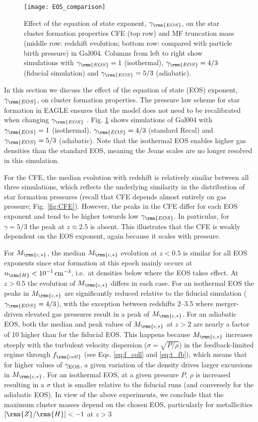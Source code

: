 \documentclass[fleqn,usenatbib]{mnras}
\newcommand\ZH{\lbrack \rmn{Z}/\rmn{H} \rbrack}
\newcommand{\cmcubed}              {\,{\rm cm}^{-3}}
\newcommand{\Mcstar}{M_\rmn{c,\ast}}
\begin{document}
\begin{figure*}
  \texttt{[image: EOS\_comparison]}
  \caption{ Effect of the equation of state exponent, $\gamma_\rmn{EOS}$, on the star cluster formation properties CFE (top row) and MF truncation mass (middle row: redshift evolution; bottom row: compared with particle birth pressure) in Gal004. Columns from left to right show simulations with $\gamma_\rmn{EOS} = 1$ (isothermal), $\gamma_\rmn{EOS} = 4/3$ (fiducial simulation) and $\gamma_\rmn{EOS} = 5/3$ (adiabatic).}
  \label{fig:EOS_test}
\end{figure*}

In this section we discuss the effect of the equation of state (EOS) exponent, $\gamma_\rmn{EOS}$, on cluster formation properties. The pressure law scheme for star formation in EAGLE ensures that the model does not need to be recalibrated when changing $\gamma_\rmn{EOS}$ \citep[see][for discussion]{S15, C15}. Fig. \ref{fig:EOS_test} shows simulations of Gal004 with $\gamma_\rmn{EOS}=1$ (isothermal), $\gamma_\rmn{EOS}=4/3$ (standard Recal) and $\gamma_\rmn{EOS}=5/3$ (adiabatic). Note that the isothermal EOS enables higher gas densities than the standard EOS, meaning the Jeans scales are no longer resolved in this simulation.

For the CFE, the median evolution with redshift is relatively similar between all three simulations, which reflects the underlying similarity in the distribution of star formation pressures (recall that CFE depends almost entirely on gas pressure; Fig. \ref{fig:CFE}). However, the peaks in the CFE differ for each EOS exponent and tend to be higher towards low $\gamma_\rmn{EOS}$. In particular, for $\gamma=5/3$ the peak at $z\approx2.5$ is absent. This illustrates that the CFE is weakly dependent on the EOS exponent, again because it scales with pressure.

For $\Mcstar$, the median $\Mcstar$ evolution at $z<0.5$ is similar for all EOS exponents since star formation at this epoch mainly occurs at $n_\rmn{H}<10^{-1}\cmcubed$, i.e.~at densities below where the EOS takes effect. At $z>0.5$ the evolution of $\Mcstar$ differs in each case. For an isothermal EOS the peaks in $\Mcstar$ are significantly reduced relative to the fiducial simulation ($\gamma_\rmn{EOS}=4/3$), with the exception between redshifts 2--3.5 where merger-driven elevated gas pressures result in a peak of $\Mcstar$. For an adiabatic EOS, both the median and peak values of $\Mcstar$ at $z>2$ are nearly a factor of 10 higher than for the fiducial EOS. This happens because $\Mcstar$ increases steeply with the turbulent velocity dispersion ($\sigma = \sqrt{P/\rho}$) in the feedback-limited regime through $f_\rmn{coll}$ (see Eqs. \ref{eq:f_coll} and \ref{eq:t_fb}), which means that for higher values of $\gamma_{\rm EOS}$, a given variation of the density drives larger excursions in $\Mcstar$. For an isothermal EOS, at a given pressure $P$, $\rho$ is increased resulting in a $\sigma$ that is smaller relative to the fiducial runs (and conversely for the adiabatic EOS). In view of the above experiments, we conclude that the maximum cluster masses depend on the chosen EOS, particularly for metallicities $\ZH<-1$ at $z>3$
\end{document}
